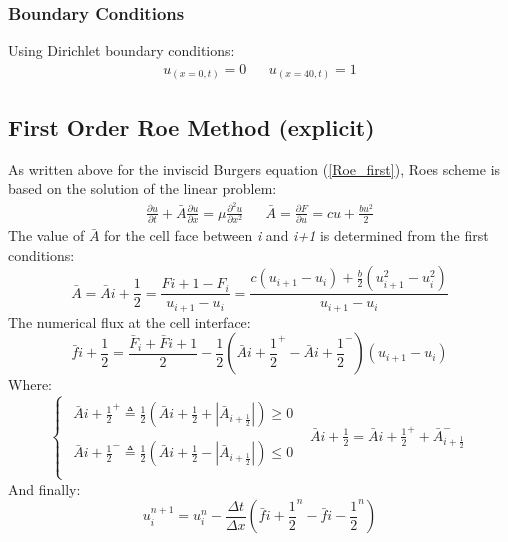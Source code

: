 \documentclass[11pt, a4paper]{article}
\begin{document}
\subsubsection{Boundary Conditions}
Using Dirichlet boundary conditions:
\begin{equation}
    \begin{matrix}
        \displaystyle u_{\left(x=0,t\right)}=0 && \displaystyle u_{\left(x=40,t\right)}=1
    \end{matrix}
\end{equation}

\subsection{First Order Roe Method (explicit)}
As written above for the inviscid Burgers equation (\ref{Roe_first}), Roes scheme is based on the solution of the linear problem:
\begin{equation}
    \begin{matrix}
        \displaystyle\frac{\partial u}{\partial t} + \bar{A}\frac{\partial u}{\partial x} = \mu\frac{\partial^2u}{\partial x^2} && \displaystyle \bar{A}=\frac{\partial F}{\partial u}=cu+\frac{bu^2}{2}
    \end{matrix}         
\end{equation}
The value of $\bar{A}$ for the cell face between \emph{i} and \emph{i+1} is determined from the first conditions:
\begin{equation}
     \bar{A}=\bar{A}{i+\frac{1}{2}}=\displaystyle\frac{F{i+1}-F_i}{u_{i+1}-u_i}=\frac{\displaystyle c\left(u_{i+1}-u_i\right)+\frac{b}{2}\left(u_{i+1}^2-u_{i}^2\right)}{u_{i+1}-u_i}
\end{equation}
The numerical flux at the cell interface:
\begin{equation}
    \displaystyle \bar{f}{i+\frac{1}{2}}=\frac{\bar{F}_i+\bar{F}{i+1}}{2}-\frac{1}{2}\left(\bar{A}{i+\frac{1}{2}}^+-\bar{A}{i+\frac{1}{2}}^-\right)\left(u_{i+1}-u_i\right)
\end{equation}
Where:
\begin{equation}
    \left\{\begin{array}{cc}
        \begin{array}{c}
            \bar{A}{i+\frac{1}{2}}^+\triangleq\displaystyle\frac{1}{2}\left(\bar{A}{i+\frac{1}{2}}+\left|\bar{A}_{i+\frac{1}{2}}\right|\right)\geq0 \\\\
            \bar{A}{i+\frac{1}{2}}^-\triangleq\displaystyle\frac{1}{2}\left(\bar{A}{i+\frac{1}{2}}-\left|\bar{A}_{i+\frac{1}{2}}\right|\right)\leq0 \\
        \end{array} & \bar{A}{i+\frac{1}{2}}=\bar{A}{i+\frac{1}{2}}^++\bar{A}_{i+\frac{1}{2}}^-
    \end{array}\right.
\end{equation}
And finally:
\begin{equation}
    u_i^{n+1}=u_i^n-\frac{\Delta t}{\Delta x}\left(\bar{f}{i+\frac{1}{2}}^n-\bar{f}{i-\frac{1}{2}}^n\right)
\end{equation}
\end{document}
